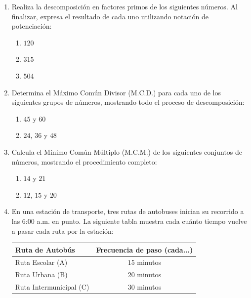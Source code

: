 \documentclass[12pt, letterpaper]{article}
\begin{document}
	\begin{enumerate}[itemsep=0.8cm]
		
		\item Realiza la descomposición en factores primos de los siguientes números. Al finalizar, expresa el resultado de cada uno utilizando notación de potenciación:
		\begin{enumerate}[label=\alph*., itemsep=0.2cm, topsep=0.2cm]
			\item $120$
			\item $315$
			\item $504$
		\end{enumerate}
		
		\item Determina el Máximo Común Divisor (M.C.D.) para cada uno de los siguientes grupos de números, mostrando todo el proceso de descomposición:
		\begin{enumerate}[label=\alph*., itemsep=0.2cm, topsep=0.2cm]
			\item $45$ y $60$
			\item $24$, $36$ y $48$
		\end{enumerate}
		
		\item Calcula el Mínimo Común Múltiplo (M.C.M.) de los siguientes conjuntos de números, mostrando el procedimiento completo:
		\begin{enumerate}[label=\alph*., itemsep=0.2cm, topsep=0.2cm]
			\item $14$ y $21$
			\item $12$, $15$ y $20$
		\end{enumerate}
		
		\item En una estación de transporte, tres rutas de autobuses inician su recorrido a las 6:00 a.m. en punto. La siguiente tabla muestra cada cuánto tiempo vuelve a pasar cada ruta por la estación:
		
		\begin{table}[h]
			\centering
			\begin{tabular}{lc}
				\toprule
				\textbf{Ruta de Autobús} & \textbf{Frecuencia de paso (cada...)} \\
				\midrule
				Ruta Escolar (A) & $15$ minutos \\
				Ruta Urbana (B) & $20$ minutos \\
				Ruta Intermunicipal (C) & $30$ minutos \\
				\bottomrule
			\end{tabular}
		\end{table}
		

\end{enumerate}
\end{document}

